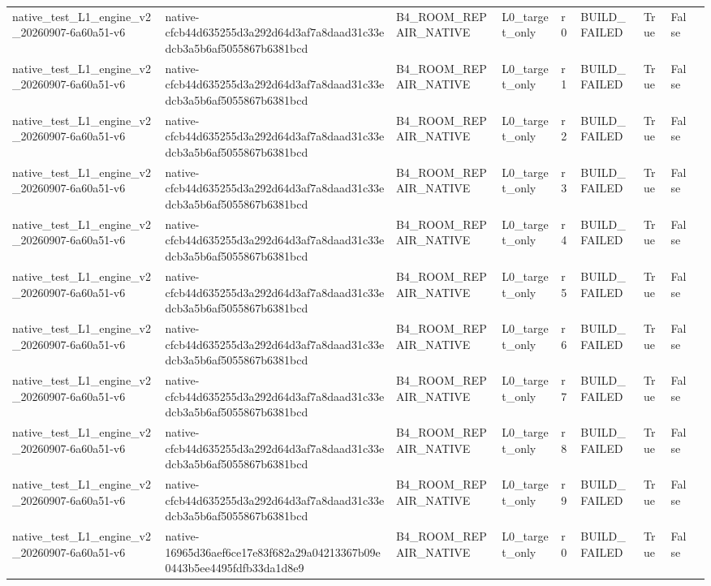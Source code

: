 \begin{tabular}{lllllllll}
native\_test\_L1\_engine\_v2\_20260907-6a60a51-v6 & native-cfcb44d635255d3a292d64d3af7a8daad31c33edcb3a5b6af5055867b6381bcd & B4\_ROOM\_REPAIR\_NATIVE & L0\_target\_only & r0 & BUILD\_FAILED & True & False &  \\
native\_test\_L1\_engine\_v2\_20260907-6a60a51-v6 & native-cfcb44d635255d3a292d64d3af7a8daad31c33edcb3a5b6af5055867b6381bcd & B4\_ROOM\_REPAIR\_NATIVE & L0\_target\_only & r1 & BUILD\_FAILED & True & False &  \\
native\_test\_L1\_engine\_v2\_20260907-6a60a51-v6 & native-cfcb44d635255d3a292d64d3af7a8daad31c33edcb3a5b6af5055867b6381bcd & B4\_ROOM\_REPAIR\_NATIVE & L0\_target\_only & r2 & BUILD\_FAILED & True & False &  \\
native\_test\_L1\_engine\_v2\_20260907-6a60a51-v6 & native-cfcb44d635255d3a292d64d3af7a8daad31c33edcb3a5b6af5055867b6381bcd & B4\_ROOM\_REPAIR\_NATIVE & L0\_target\_only & r3 & BUILD\_FAILED & True & False &  \\
native\_test\_L1\_engine\_v2\_20260907-6a60a51-v6 & native-cfcb44d635255d3a292d64d3af7a8daad31c33edcb3a5b6af5055867b6381bcd & B4\_ROOM\_REPAIR\_NATIVE & L0\_target\_only & r4 & BUILD\_FAILED & True & False &  \\
native\_test\_L1\_engine\_v2\_20260907-6a60a51-v6 & native-cfcb44d635255d3a292d64d3af7a8daad31c33edcb3a5b6af5055867b6381bcd & B4\_ROOM\_REPAIR\_NATIVE & L0\_target\_only & r5 & BUILD\_FAILED & True & False &  \\
native\_test\_L1\_engine\_v2\_20260907-6a60a51-v6 & native-cfcb44d635255d3a292d64d3af7a8daad31c33edcb3a5b6af5055867b6381bcd & B4\_ROOM\_REPAIR\_NATIVE & L0\_target\_only & r6 & BUILD\_FAILED & True & False &  \\
native\_test\_L1\_engine\_v2\_20260907-6a60a51-v6 & native-cfcb44d635255d3a292d64d3af7a8daad31c33edcb3a5b6af5055867b6381bcd & B4\_ROOM\_REPAIR\_NATIVE & L0\_target\_only & r7 & BUILD\_FAILED & True & False &  \\
native\_test\_L1\_engine\_v2\_20260907-6a60a51-v6 & native-cfcb44d635255d3a292d64d3af7a8daad31c33edcb3a5b6af5055867b6381bcd & B4\_ROOM\_REPAIR\_NATIVE & L0\_target\_only & r8 & BUILD\_FAILED & True & False &  \\
native\_test\_L1\_engine\_v2\_20260907-6a60a51-v6 & native-cfcb44d635255d3a292d64d3af7a8daad31c33edcb3a5b6af5055867b6381bcd & B4\_ROOM\_REPAIR\_NATIVE & L0\_target\_only & r9 & BUILD\_FAILED & True & False &  \\
native\_test\_L1\_engine\_v2\_20260907-6a60a51-v6 & native-16965d36aef6ce17e83f682a29a04213367b09e0443b5ee4495fdfb33da1d8e9 & B4\_ROOM\_REPAIR\_NATIVE & L0\_target\_only & r0 & BUILD\_FAILED & True & False &  \\

\end{tabular}
